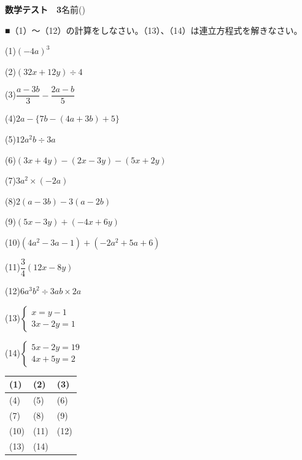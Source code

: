 \documentclass[a4paper,11pt]{ltjsarticle}
\newlength{\qcol}\setlength{\qcol}{0.47\textwidth}
\newlength{\qgap}
\newlength{\anscolw}\setlength{\anscolw}{0.30\textwidth}
\newlength{\ansh}
\newcommand{\Q}[2]{\parbox[t]{\qcol}{\raggedright (#1)\hspace{0.6em}$\displaystyle #2$}}
\newcommand{\QR}[4]{\Q{#1}{#2}\hfill\Q{#3}{#4}\par\vspace{\qgap}}
\newcommand{\anscell}[1]{\rule[-\ansdrop]{0pt}{\ansh}(#1)}
\newlength{\ansdrop}
\begin{document}
{\large\bfseries 数学テスト　3}\hfill 名前(\underline{\hspace{32mm}})\par\vspace{3mm}
■（1）〜（12）の計算をしなさい。（13）、（14）は連立方程式を解きなさい。\par\vspace{3mm}
\setlength{\qgap}{11mm}
\QR{1}{(-4a)^3}{2}{(32x+12y)\div4}
\QR{3}{\dfrac{a-3b}{3}-\dfrac{2a-b}{5}}{4}{2a-\{7b-(4a+3b)+5\}}
\QR{5}{12a^2b\div3a}{6}{(3x+4y)-(2x-3y)-(5x+2y)}
\QR{7}{3a^2\times(-2a)}{8}{2(a-3b)-3(a-2b)}
\QR{9}{(5x-3y)+(-4x+6y)}{10}{(4a^2-3a-1)+(-2a^2+5a+6)}
\QR{11}{\dfrac{3}{4}(12x-8y)}{12}{6a^3b^2\div3ab\times2a}
\QR{13}{\left\{\begin{array}{l} x=y-1 \\ 3x-2y=1 \end{array}\right.}{14}{\left\{\begin{array}{l} 5x-2y=19 \\ 4x+5y=2 \end{array}\right.}
\vspace{2mm}
\setlength{\ansh}{11mm}\setlength{\ansdrop}{7mm}%
\begin{center}\begin{tabular}{|p{\anscolw}|p{\anscolw}|p{\anscolw}|}\hline
\anscell{1} & \anscell{2} & \anscell{3} \\\hline
\anscell{4} & \anscell{5} & \anscell{6} \\\hline
\anscell{7} & \anscell{8} & \anscell{9} \\\hline
\anscell{10} & \anscell{11} & \anscell{12} \\\hline
\anscell{13} & \anscell{14} &  \\\hline
\end{tabular}\end{center}

\newpage
\end{document}
